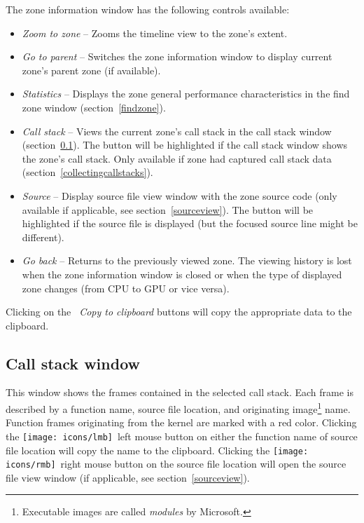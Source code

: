 \documentclass[hidelinks,titlepage,a4paper,twoside]{article}
\newcommand{\LMB}{\texttt{[image: icons/lmb]}}
\newcommand{\RMB}{\texttt{[image: icons/rmb]}}
\begin{document}
The zone information window has the following controls available:

\begin{itemize}
\item \emph{\faMicroscope{} Zoom to zone} -- Zooms the timeline view to the zone's extent.
\item \emph{\faArrowUp{} Go to parent} -- Switches the zone information window to display current zone's parent zone (if available).
\item \emph{\faChartBar{} Statistics} -- Displays the zone general performance characteristics in the find zone window (section~\ref{findzone}).
\item \emph{\faAlignJustify{} Call stack} -- Views the current zone's call stack in the call stack window (section~\ref{callstackwindow}). The button will be highlighted if the call stack window shows the zone's call stack. Only available if zone had captured call stack data (section~\ref{collectingcallstacks}).
\item \emph{\faFile*{} Source} -- Display source file view window with the zone source code (only available if applicable, see section~\ref{sourceview}). The button will be highlighted if the source file is displayed (but the focused source line might be different).
\item \emph{\faArrowLeft{} Go back} -- Returns to the previously viewed zone. The viewing history is lost when the zone information window is closed or when the type of displayed zone changes (from CPU to GPU or vice versa).
\end{itemize}

Clicking on the \emph{\faClipboard{}~Copy to clipboard} buttons will copy the appropriate data to the clipboard.

\subsection{Call stack window}
\label{callstackwindow}

This window shows the frames contained in the selected call stack. Each frame is described by a function name, source file location, and originating image\footnote{Executable images are called \emph{modules} by Microsoft.} name. Function frames originating from the kernel are marked with a red color. Clicking the \LMB{}~left mouse button on either the function name of source file location will copy the name to the clipboard. Clicking the \RMB{}~right mouse button on the source file location will open the source file view window (if applicable, see section~\ref{sourceview}).
\end{document}
